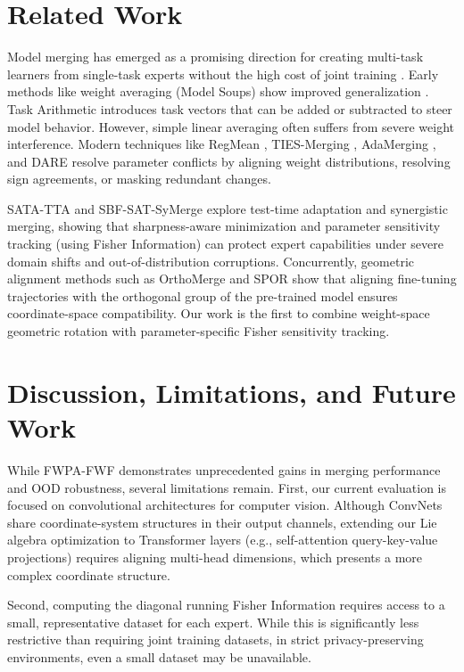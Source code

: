 \documentclass{article}
\theoremstyle{plain}
\theoremstyle{definition}
\theoremstyle{remark}
\begin{document}
\section{Related Work}
\label{sec:related}
Model merging has emerged as a promising direction for creating multi-task learners from single-task experts without the high cost of joint training \cite{wortsman22, ilharco22, yadav23}. Early methods like weight averaging (Model Soups) show improved generalization \cite{wortsman22}. Task Arithmetic \cite{ilharco22} introduces task vectors that can be added or subtracted to steer model behavior. However, simple linear averaging often suffers from severe weight interference. Modern techniques like RegMean \cite{jin22}, TIES-Merging \cite{yadav23}, AdaMerging \cite{lu23}, and DARE \cite{yu23} resolve parameter conflicts by aligning weight distributions, resolving sign agreements, or masking redundant changes. 

SATA-TTA \cite{sata_tta} and SBF-SAT-SyMerge \cite{sbf_symerge} explore test-time adaptation and synergistic merging, showing that sharpness-aware minimization and parameter sensitivity tracking (using Fisher Information) can protect expert capabilities under severe domain shifts and out-of-distribution corruptions. Concurrently, geometric alignment methods such as OrthoMerge and SPOR \cite{orthomerge} show that aligning fine-tuning trajectories with the orthogonal group of the pre-trained model ensures coordinate-space compatibility. Our work is the first to combine weight-space geometric rotation with parameter-specific Fisher sensitivity tracking.

\section{Discussion, Limitations, and Future Work}
\label{sec:discussion}
While FWPA-FWF demonstrates unprecedented gains in merging performance and OOD robustness, several limitations remain. First, our current evaluation is focused on convolutional architectures for computer vision. Although ConvNets share coordinate-system structures in their output channels, extending our Lie algebra optimization to Transformer layers (e.g., self-attention query-key-value projections) requires aligning multi-head dimensions, which presents a more complex coordinate structure. 

Second, computing the diagonal running Fisher Information requires access to a small, representative dataset for each expert. While this is significantly less restrictive than requiring joint training datasets, in strict privacy-preserving environments, even a small dataset may be unavailable. 
\end{document}
